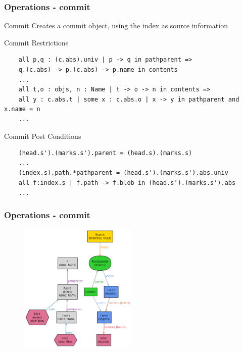 \documentclass{beamer}
\begin{document}
\begin{frame}[fragile]
   \frametitle{Operations - commit}
   \begin{block}{Commit}
      Creates a commit object, using the index as source information
   \end{block}
   \tiny
   \begin{block}{Commit Restrictions}
   	\begin{lstlisting}
	all p,q : (c.abs).univ | p -> q in pathparent => 
	q.(c.abs) -> p.(c.abs) -> p.name in contents
	...
	all t,o : objs, n : Name | t -> o -> n in contents => 
	all y : c.abs.t | some x : c.abs.o | x -> y in pathparent and x.name = n
	...
   \end{lstlisting}
	\end{block}
	\begin{block}{Commit Post Conditions}
	\begin{lstlisting}
	(head.s').(marks.s').parent = (head.s).(marks.s)
	...
	(index.s).path.*pathparent = (head.s').(marks.s').abs.univ
	all f:index.s | f.path -> f.blob in (head.s').(marks.s').abs
	...
   	\end{lstlisting}
	\end{block}
\end{frame}

\begin{frame}[fragile]
   \frametitle{Operations - commit}
   \begin{figure}
      \centering
      \includegraphics[width=0.5\textwidth]{images/commit1.png}
   \end{figure}
\end{frame}
\end{document}
